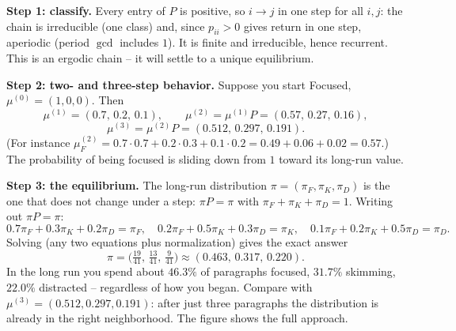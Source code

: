 \textbf{Step 1: classify.} Every entry of $P$ is positive, so $i \to j$ in one step for all
$i,j$: the chain is irreducible (one class) and, since $p_{ii}>0$ gives return in one step,
aperiodic (period $\gcd$ includes $1$). It is finite and irreducible, hence recurrent. This is
an ergodic chain -- it will settle to a unique equilibrium.

\textbf{Step 2: two- and three-step behavior.} Suppose you start Focused, $\mu^{(0)} =
(1,0,0)$. Then
\[
  \mu^{(1)} = (0.7,\,0.2,\,0.1), \qquad
  \mu^{(2)} = \mu^{(1)}P = (0.57,\,0.27,\,0.16),
\]
\[
  \mu^{(3)} = \mu^{(2)}P = (0.512,\,0.297,\,0.191).
\]
(For instance $\mu^{(2)}_F = 0.7\cdot0.7 + 0.2\cdot0.3 + 0.1\cdot0.2 = 0.49+0.06+0.02 =
0.57$.) The probability of being focused is sliding down from $1$ toward its long-run value.

\textbf{Step 3: the equilibrium.} The long-run distribution $\pi = (\pi_F, \pi_K, \pi_D)$ is
the one that does not change under a step: $\pi P = \pi$ with $\pi_F + \pi_K + \pi_D = 1$.
Writing out $\pi P = \pi$:
\[
  0.7\pi_F + 0.3\pi_K + 0.2\pi_D = \pi_F, \quad
  0.2\pi_F + 0.5\pi_K + 0.3\pi_D = \pi_K, \quad
  0.1\pi_F + 0.2\pi_K + 0.5\pi_D = \pi_D.
\]
Solving (any two equations plus normalization) gives the exact answer
\[
  \pi = \Big(\tfrac{19}{41},\, \tfrac{13}{41},\, \tfrac{9}{41}\Big)
      \approx (0.463,\, 0.317,\, 0.220).
\]
In the long run you spend about $46.3\%$ of paragraphs focused, $31.7\%$ skimming, $22.0\%$
distracted -- regardless of how you began. Compare with $\mu^{(3)} = (0.512, 0.297, 0.191)$:
after just three paragraphs the distribution is already in the right neighborhood. The figure
shows the full approach.

